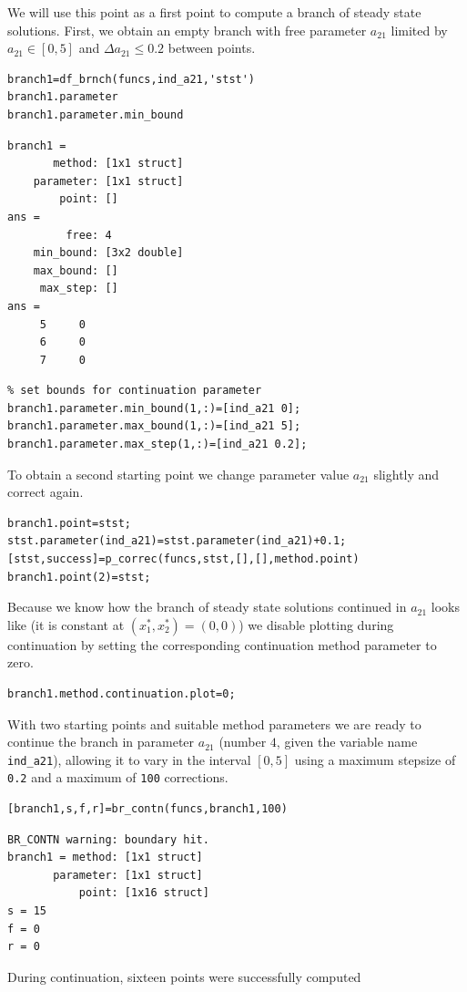 \documentclass[10pt]{scrartcl}
\newcommand{\blist}[1]{\mbox{\lstinline!#1!}}
\begin{document}
We will use this point as a first point to compute a branch of steady
state solutions.  First, we obtain an empty branch with free parameter
$a_{21}$ limited by $a_{21}\in[0,5]$ and $\Delta a_{21}\leq 0.2$
between points.  
\begin{lstlisting}
branch1=df_brnch(funcs,ind_a21,'stst')
branch1.parameter
branch1.parameter.min_bound
\end{lstlisting}
{\small
\begin{verbatim}
branch1 = 
       method: [1x1 struct]
    parameter: [1x1 struct]
        point: []
ans = 
         free: 4
    min_bound: [3x2 double]
    max_bound: []
     max_step: []
ans =
     5     0
     6     0
     7     0
\end{verbatim}
}
\begin{lstlisting}
% set bounds for continuation parameter
branch1.parameter.min_bound(1,:)=[ind_a21 0];
branch1.parameter.max_bound(1,:)=[ind_a21 5];
branch1.parameter.max_step(1,:)=[ind_a21 0.2];
\end{lstlisting}
To obtain a second starting point we change parameter value $a_{21}$
slightly and correct again.
\begin{lstlisting}
branch1.point=stst;  
stst.parameter(ind_a21)=stst.parameter(ind_a21)+0.1;
[stst,success]=p_correc(funcs,stst,[],[],method.point)
branch1.point(2)=stst;
\end{lstlisting}
Because we know how the branch of steady state solutions
continued in $a_{21}$ looks like (it is constant at
$(x_1^*,x_2^*)=(0,0)$) we disable plotting during continuation
by setting the corresponding continuation method parameter to zero.
\begin{lstlisting}
branch1.method.continuation.plot=0;  
\end{lstlisting}
With two starting points and suitable method parameters we are ready
to continue the branch in parameter $a_{21}$ (number $4$, given the
variable name \blist{ind_a21}), allowing it to vary in the interval
$[0,5]$ using a maximum stepsize of \texttt{0.2} and a maximum of
\texttt{100} corrections.
\begin{lstlisting}
[branch1,s,f,r]=br_contn(funcs,branch1,100)  
\end{lstlisting}
{\small
\begin{verbatim}
BR_CONTN warning: boundary hit.
branch1 = method: [1x1 struct]
       parameter: [1x1 struct]
           point: [1x16 struct]
s = 15
f = 0
r = 0
\end{verbatim}
} During continuation, sixteen points were successfully computed
\end{document}

